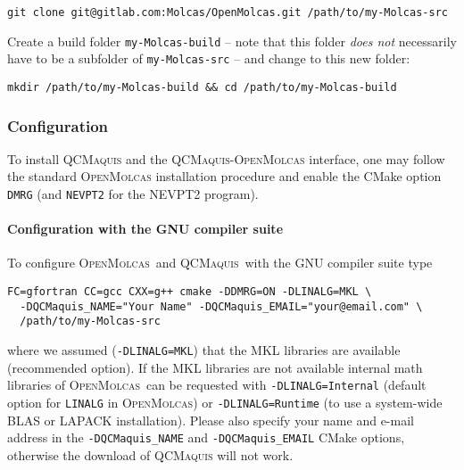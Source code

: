 \documentclass[bibliography=totoc,12pt,a4paper]{scrartcl}
\newcommand{\mol}{\textsc{OpenMolcas}}
\newcommand{\qcm}{\textsc{QCMaquis}}
\newcommand{\molbuild}{\texttt{my-Molcas-build}}
\newcommand{\kwd}[1]{\texttt{#1}}
\begin{document}
\begin{verbatim}
git clone git@gitlab.com:Molcas/OpenMolcas.git /path/to/my-Molcas-src
\end{verbatim}

\noindent Create a build folder \texttt{\molbuild} -- note that this folder \emph{does not} necessarily have to be a subfolder
of \texttt{my-Molcas-src} -- and change to this new folder:
\begin{verbatim}
mkdir /path/to/my-Molcas-build && cd /path/to/my-Molcas-build
\end{verbatim}

\subsubsection{Configuration}\label{subsubsec:configure}

To install \qcm{} and the \qcm{}-\mol{} interface, one may follow the standard \mol{} installation procedure and enable the CMake option \kwd{DMRG} (and \kwd{NEVPT2} for the NEVPT2 program).


\paragraph{Configuration with the GNU compiler suite}\label{sec:gnu-conf}$\;$\\

\noindent To configure \mol\ and \qcm\ with the GNU compiler suite type
\begin{verbatim}
FC=gfortran CC=gcc CXX=g++ cmake -DDMRG=ON -DLINALG=MKL \
  -DQCMaquis_NAME="Your Name" -DQCMaquis_EMAIL="your@email.com" \
  /path/to/my-Molcas-src
\end{verbatim}

\noindent where we assumed (\texttt{-DLINALG=MKL}) that the MKL libraries are available (recommended option).
If the MKL libraries are not available internal math libraries of \mol\ can be requested with \texttt{-DLINALG=Internal} (default option for \texttt{LINALG} in \mol) or \texttt{-DLINALG=Runtime} (to use a system-wide BLAS or LAPACK installation). Please also specify your name and e-mail address in the \texttt{-DQCMaquis\_NAME} and \texttt{-DQCMaquis\_EMAIL} CMake options, otherwise the download of \qcm{} will not work.
\end{document}
